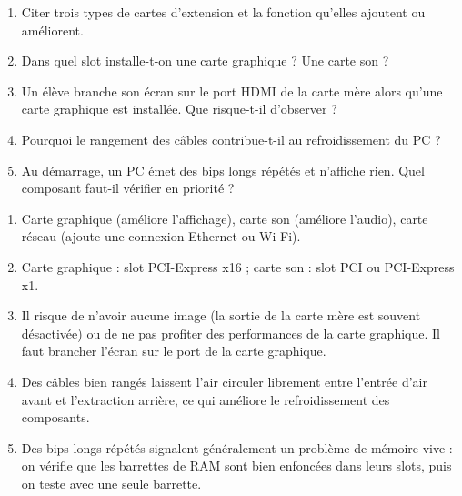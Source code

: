 \documentclass[11pt]{article}
\begin{document}
\begin{exercice}
\begin{enumerate}
\item Citer trois types de cartes d'extension et la fonction qu'elles ajoutent ou améliorent.
\item Dans quel slot installe-t-on une carte graphique ? Une carte son ?
\item Un élève branche son écran sur le port HDMI de la carte mère alors qu'une carte graphique est installée. Que risque-t-il d'observer ?
\item Pourquoi le rangement des câbles contribue-t-il au refroidissement du PC ?
\item Au démarrage, un PC émet des bips longs répétés et n'affiche rien. Quel composant faut-il vérifier en priorité ?
\end{enumerate}
\end{exercice}

\begin{corrige}[Exercice]
\begin{enumerate}
\item Carte graphique (améliore l'affichage), carte son (améliore l'audio), carte réseau (ajoute une connexion Ethernet ou Wi-Fi).
\item Carte graphique : slot PCI-Express x16 ; carte son : slot PCI ou PCI-Express x1.
\item Il risque de n'avoir aucune image (la sortie de la carte mère est souvent désactivée) ou de ne pas profiter des performances de la carte graphique. Il faut brancher l'écran sur le port de la carte graphique.
\item Des câbles bien rangés laissent l'air circuler librement entre l'entrée d'air avant et l'extraction arrière, ce qui améliore le refroidissement des composants.
\item Des bips longs répétés signalent généralement un problème de mémoire vive : on vérifie que les barrettes de RAM sont bien enfoncées dans leurs slots, puis on teste avec une seule barrette.
\end{enumerate}
\end{corrige}
\end{document}
